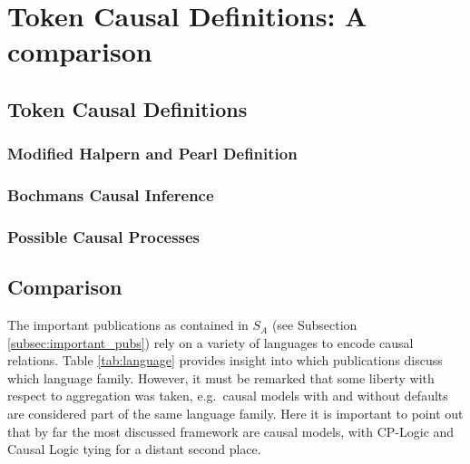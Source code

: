 \documentclass[11pt,a4paper]{book}
\theoremstyle{definition}
\theoremstyle{definition}
\theoremstyle{definition}
\theoremstyle{remark}
\newcommand{\prset}{S_{A}}
\begin{document}
\chapter{Token Causal Definitions: A comparison}
\label{ch:literature_review}

\section{Token Causal Definitions}
\subsection{Modified Halpern and Pearl Definition}

\subsection{Bochmans Causal Inference}

\subsection{Possible Causal Processes}


\section{Comparison}


The important publications as contained in $\prset$ (see Subsection \ref{subsec:important_pubs}) rely on a variety of languages to encode causal relations. Table \ref{tab:language} provides insight into which publications discuss which language family.
However, it must be remarked that some liberty with respect to aggregation was taken, e.g.\ causal models with and without defaults are considered part of the same language family. 
Here it is important to point out that by far the most discussed framework are causal models, with CP-Logic and Causal Logic tying for a distant second place. 
\end{document}
